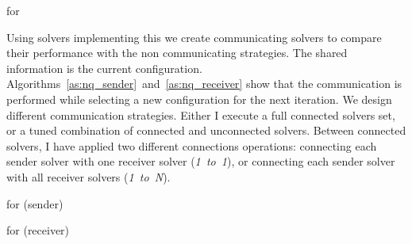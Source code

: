 \begin{algorithm}[H]
\dontprintsemicolon
\SetNoline
{}
\caption{\As{} for \NQP}\label{as:nq}
\end{algorithm}

Using solvers implementing this \as{} we create communicating solvers to compare their performance with the non communicating strategies. The shared information is the current configuration. Algorithms~\ref{as:nq_sender}~and~\ref{as:nq_receiver} show that the communication is performed while selecting a new configuration for the next iteration. We design different communication strategies. Either I execute a full connected solvers set, or a tuned combination of connected and unconnected solvers. Between connected solvers, I have applied two different connections operations: connecting each sender solver with one receiver solver ({\it 1~to~1}), or connecting each sender solver with all receiver solvers ({\it 1~to~N}).

\begin{algorithm}[H]
\dontprintsemicolon
\SetNoline
{}
\caption{\As{} for \NQP{} (sender)}\label{as:nq_sender}
\end{algorithm}

\begin{algorithm}[H]
\dontprintsemicolon
\SetNoline
{}
\caption{\As{} for \NQP{} (receiver)}\label{as:nq_receiver}
\end{algorithm}

